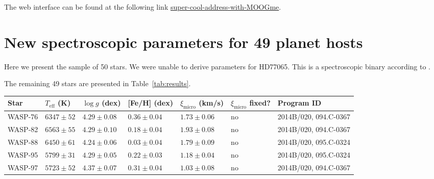 \documentclass{aa}
\begin{document}
The web interface can be found at the following link
\url{super-cool-address-with-MOOGme}.



\section{New spectroscopic parameters for 49 planet hosts}
\label{sec:results}
Here we present the sample of 50 stars. We were unable to derive parameters for
HD77065. This is a spectroscopic binary according to \cite{Pourbaix2004}.

The remaining 49 stars are presented in Table~\ref{tab:results}.

\begin{table*}[htb!]
    \caption{The derived parameters for the 49 stars in our sample.}
    \label{tab:results}
    \centering
    \begin{tabular}{lllllll}
      \hline\hline
        Star      & $T_\mathrm{eff}$ (K) &  $\log g$ (dex)     &  [Fe/H] (dex)        &  $\xi_\mathrm{micro}$ (km/s) & $\xi_\mathrm{micro}$ fixed? & Program ID \\
      \hline
      WASP-76     &  $6347 \pm  52$      &  $4.29 \pm 0.08$    &  $ 0.36 \pm 0.04$    &  $1.73 \pm 0.06$             &             no              &  2014B/020,  094.C-0367                                                                                                  \\
      WASP-82     &  $6563 \pm  55$      &  $4.29 \pm 0.10$    &  $ 0.18 \pm 0.04$    &  $1.93 \pm 0.08$             &             no              &  2014B/020,  094.C-0367                                                                                                  \\
      WASP-88     &  $6450 \pm  61$      &  $4.24 \pm 0.06$    &  $ 0.03 \pm 0.04$    &  $1.79 \pm 0.09$             &             no              &  2014B/020,  095.C-0324                                                                                                  \\
      WASP-95     &  $5799 \pm  31$      &  $4.29 \pm 0.05$    &  $ 0.22 \pm 0.03$    &  $1.18 \pm 0.04$             &             no              &  2014B/020,  095.C-0324                                                                                                  \\
      WASP-97     &  $5723 \pm  52$      &  $4.37 \pm 0.07$    &  $ 0.31 \pm 0.04$    &  $1.03 \pm 0.08$             &             no              &  2014B/020,  094.C-0367                                                                                                  \\

\end{tabular}
\end{table*}
\end{document}
